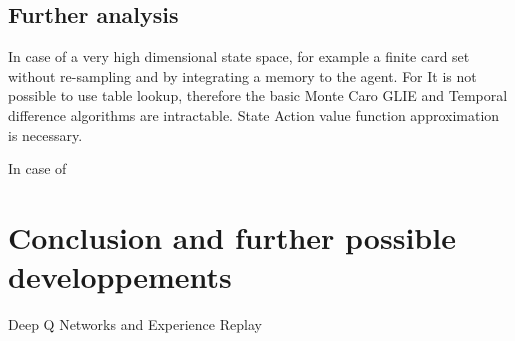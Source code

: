 \documentclass[12pt,a4paper]{article}
\begin{document}
\subsection{Further analysis}
In case of a very high dimensional state space, for example a finite card set without re-sampling and by integrating a memory to the agent. For 
It is not possible to use table lookup, therefore the basic Monte Caro GLIE and Temporal difference algorithms are intractable. State Action value function approximation is necessary. 

In case of 

\section{Conclusion and further possible developpements}
Deep Q Networks and Experience Replay \cite{mnih-dqn-2015}


\newpage
\nocite{*}


\end{document}
